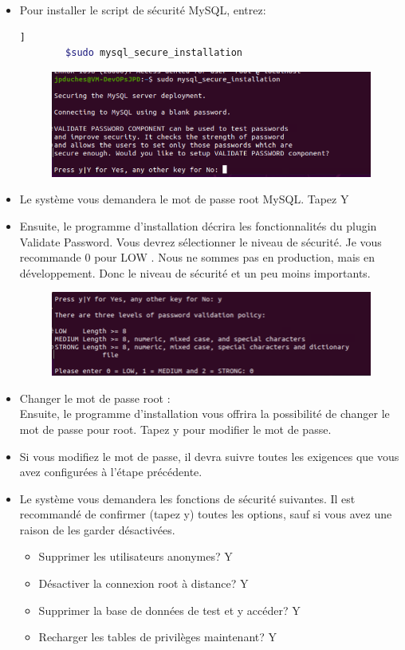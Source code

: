 \begin{itemize}
		\item Pour installer le script de sécurité MySQL, entrez:  \begin{lstlisting}[language=bash]   ]
		$sudo mysql_secure_installation
		\end{lstlisting}
		\begin{figure}[!htb]
			\centering
			\includegraphics[scale=0.7]{images/capture7}
		\end{figure}
		
		\item Le système vous demandera le mot de passe root MySQL. Tapez {\color{blue}Y}
		\item Ensuite, le programme d'installation décrira les fonctionnalités du plugin Validate Password. Vous devrez sélectionner le niveau de sécurité. Je vous recommande {\color{blue}0 pour LOW }. Nous ne sommes pas en production, mais en développement. Donc le niveau de sécurité et un peu moins importants.
		
		
		\begin{figure}[!htb]
			\centering
			\includegraphics[scale=0.7]{images/capture8}
		\end{figure}
		
		\item Changer le mot de passe root : \\
		Ensuite, le programme d'installation vous offrira la possibilité de changer le mot de passe pour root. Tapez y pour modifier le mot de passe.
		
		\item Si vous modifiez le mot de passe, il devra suivre toutes les exigences que vous avez configurées à l'étape précédente.
		
		\item Le système vous demandera les fonctions de sécurité suivantes. Il est recommandé de confirmer (tapez y) toutes les options, sauf si vous avez une raison de les garder désactivées.
		\begin{itemize}
			\item Supprimer les utilisateurs anonymes? {\color{blue}Y}
			\item Désactiver la connexion root à distance? {\color{blue}Y}
			\item Supprimer la base de données de test et y accéder? {\color{blue}Y}
			\item Recharger les tables de privilèges maintenant? {\color{blue}Y}
			

\end{itemize}
\end{itemize}
